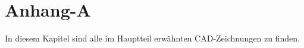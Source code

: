 
\chapter{Anhang-A}\label{kap:anhang-A0}

In diesem Kapitel sind alle im Hauptteil erwähnten CAD-Zeichnungen zu finden.





